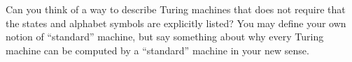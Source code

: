 \documentclass[../../../include/open-logic-section]{subfiles}
\begin{document}
\begin{prob}
  Can you think of a way to describe Turing machines that does not
  require that the states and alphabet symbols are explicitly listed?
  You may define your own notion of ``standard'' machine, but say
  something about why every Turing machine can be computed by a
  ``standard'' machine in your new sense.
\end{prob}
\end{document}
